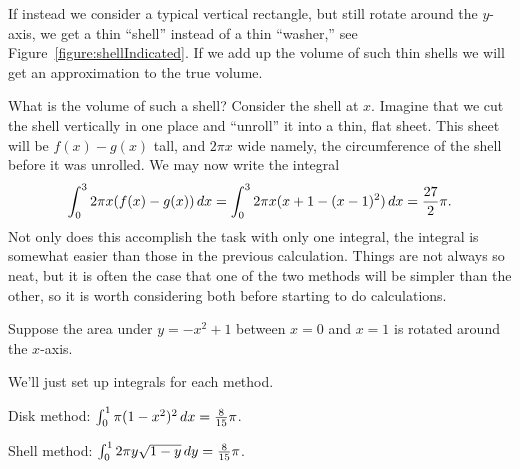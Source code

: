 If instead we consider a typical vertical rectangle, but still rotate
around the $y$-axis, we get a thin ``shell'' instead of a thin
``washer,'' see Figure~\ref{figure:shellIndicated}. If we add up the
volume of such thin shells we will get an approximation to the true
volume. 






What is the volume of such a shell?  Consider the shell at
$x$.  Imagine that we cut the shell vertically in one place and
``unroll'' it into a thin, flat sheet. This sheet will be $f(x)-g(x)$
tall, and $2\pi x$ wide namely, the circumference of the shell before
it was unrolled.  We may now write the integral
$$
  \int_0^3 2\pi x(f(x)-g(x))\, d x=
  \int_0^3 2\pi x(x+1-(x-1)^2)\, d x={27\over2}\pi.
$$
Not only does this accomplish the task with only one integral, the
integral is somewhat easier than those in the previous
calculation. Things are not always so neat, but it is often the case
that one of the two methods will be simpler than the other, so it is
worth considering both before starting to do calculations.

\begin{example} 
Suppose the area under $y=-x^2+1$ between $x=0$ and $x=1$ is rotated
around the $x$-axis.
\end{example}

\begin{solution}
We'll just set up integrals for each method.

Disk method: $\int_0^1 \pi(1-x^2)^2\, d x={8\over15}\pi$.


Shell method: $\int_0^1 2\pi y \sqrt{1-y}\, d y={8\over15}\pi$.
\end{solution}

